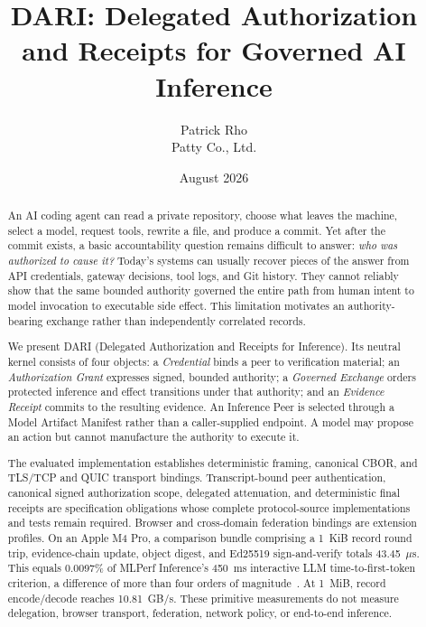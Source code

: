 \documentclass[10pt]{article}
\title{DARI: Delegated Authorization and Receipts for Governed AI Inference}
\author{Patrick Rho\\Patty Co., Ltd.}
\date{August 2026}
\newcommand{\dariname}{DARI}
\begin{document}
\maketitle

\begin{abstract}
An AI coding agent can read a private repository, choose what leaves the machine, select a model, request tools, rewrite a file, and produce a commit. Yet after the commit exists, a basic accountability question remains difficult to answer: \emph{who was authorized to cause it?} Today's systems can usually recover pieces of the answer from API credentials, gateway decisions, tool logs, and Git history. They cannot reliably show that the same bounded authority governed the entire path from human intent to model invocation to executable side effect. This limitation motivates an authority-bearing exchange rather than independently correlated records.

We present \dariname{} (Delegated Authorization and Receipts for Inference). Its neutral kernel consists of four objects: a \emph{Credential} binds a peer to verification material; an \emph{Authorization Grant} expresses signed, bounded authority; a \emph{Governed Exchange} orders protected inference and effect transitions under that authority; and an \emph{Evidence Receipt} commits to the resulting evidence. An Inference Peer is selected through a Model Artifact Manifest rather than a caller-supplied endpoint. A model may propose an action but cannot manufacture the authority to execute it.

The evaluated implementation establishes deterministic framing, canonical CBOR, and TLS/TCP and QUIC transport bindings. Transcript-bound peer authentication, canonical signed authorization scope, delegated attenuation, and deterministic final receipts are specification obligations whose complete protocol-source implementations and tests remain required. Browser and cross-domain federation bindings are extension profiles. On an Apple M4 Pro, a comparison bundle comprising a 1~KiB record round trip, evidence-chain update, object digest, and Ed25519 sign-and-verify totals 43.45~$\mu$s. This equals 0.0097\% of MLPerf Inference's 450~ms interactive LLM time-to-first-token criterion, a difference of more than four orders of magnitude~\cite{mlperf2025llm}. At 1~MiB, record encode/decode reaches 10.81~GB/s. These primitive measurements do not measure delegation, browser transport, federation, network policy, or end-to-end inference.
\end{abstract}
\end{document}
